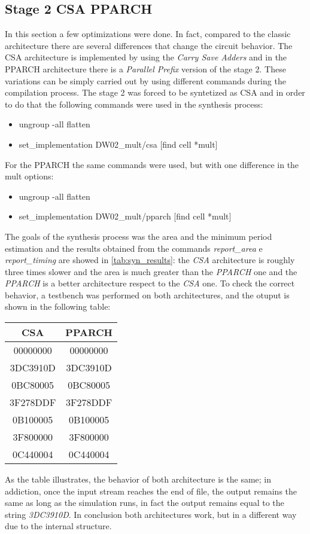 \subsection{Stage 2 CSA PPARCH}
In this section a few optimizations were done. In fact, compared to the classic architecture there are several differences that change the circuit behavior. The CSA architecture is implemented by using the \textit{Carry Save Adders} and in the PPARCH architecture there is a \textit{Parallel Prefix} version of the stage 2. These variations can be simply carried out by using different commands during the compilation process. The stage 2 was forced to be syntetized as CSA and in order to do that the following commands were used in the synthesis process:

\begin{itemize}
\item ungroup -all flatten
\item set\_implementation DW02\_mult/csa [find cell *mult]
\end{itemize}
For the PPARCH the same commands were used, but with one difference in the mult options:
\begin{itemize}
\item ungroup -all flatten
\item set\_implementation DW02\_mult/pparch [find cell *mult]
\end{itemize}
The goals of the synthesis process was the area and the minimum period estimation and the results obtained from the commands \textit{report\_area} e \textit{report\_timing} are showed in \autoref{tab:syn_results}: the \textit{CSA} architecture is roughly three times slower and the area is much greater than the \textit{PPARCH} one and the \textit{PPARCH} is a better architecture respect to the \textit{CSA} one.
To check the correct behavior, a testbench was performed on both architectures, and the otuput is shown in the following table:

\begin{table}[H]
\begin{center}
\begin{tabular}{cc}				
CSA		 	  & PPARCH 					\\ \hline
00000000   	  & 00000000               	\\ 
3DC3910D      & 3DC3910D                \\ 
0BC80005      & 0BC80005                \\ 
3F278DDF      & 3F278DDF                \\ 
0B100005      & 0B100005                  \\ 
3F800000      & 3F800000              \\ 
0C440004      & 0C440004 
\end{tabular}
\end{center}
\end{table}
As the table illustrates, the behavior of both architecture is the same; in addiction, once the input stream reaches the end of file, the output remains the same as long as the simulation runs, in fact the output remains equal to the string \textit{3DC3910D}. In conclusion both architectures work, but in a different way due to the internal structure.

